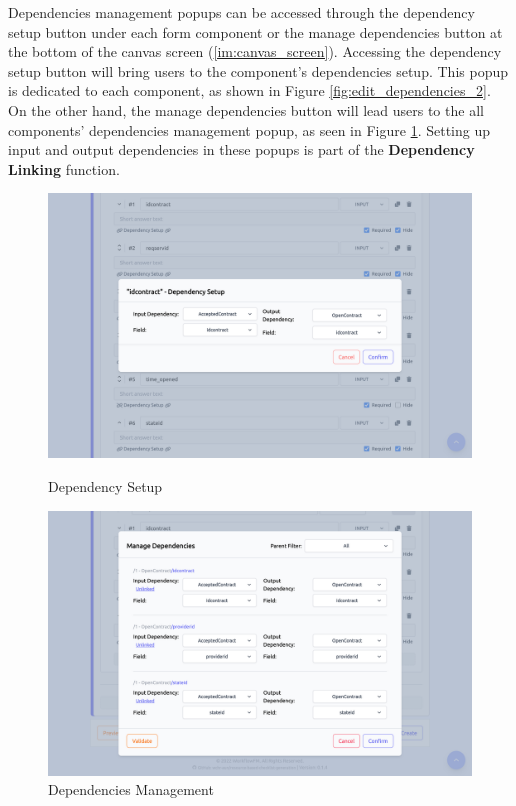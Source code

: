 Dependencies management popups can be accessed through the dependency setup button under each form component or the manage dependencies button at the bottom of the canvas screen (\ref{im:canvas_screen}). Accessing the dependency setup button will bring users to the component's dependencies setup. This popup is dedicated to each component, as shown in Figure \ref{fig:edit_dependencies_2}. On the other hand, the manage dependencies button will lead users to the all components' dependencies management popup, as seen in Figure \ref{fig:edit_dependencies}. Setting up input and output dependencies in these popups is part of the \textbf{Dependency Linking} function.

\begin{figure}[ht!]
\centering
\begin{minipage}{.5\textwidth}
  \centering
  \includegraphics[width=0.9\linewidth]{overleaf/images/screens/edit_dependencies_2.png}
  \caption{Dependency Setup}
  \label{fig:edit_dependencies_2}
\end{minipage}%
\begin{minipage}{.5\textwidth}
  \centering
  \includegraphics[width=0.9\linewidth]{overleaf/images/screens/edit_dependencies.png}
  \caption{Dependencies Management}
  \label{fig:edit_dependencies}
\end{minipage}
\end{figure}


